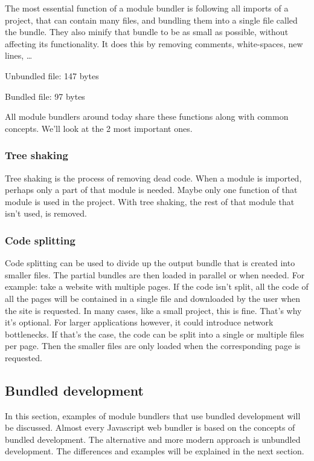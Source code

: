 The most essential function of a module bundler is following all imports of a project, that can contain many files, and bundling them into a single file called the bundle. They also minify that bundle to be as small as possible, without affecting its functionality. It does this by removing comments, white-spaces, new lines, … 

Unbundled file: 147 bytes

Bundled file: 97 bytes


All module bundlers around today share these functions along with common concepts. We’ll look at the 2 most important ones. 

\subsubsection{Tree shaking}

Tree shaking is the process of removing dead code. When a module is imported, perhaps only a part of that module is needed. Maybe only one function of that module is used in the project. With tree shaking, the rest of that module that isn’t used, is removed. 

\subsubsection{Code splitting}

Code splitting can be used to divide up the output bundle that is created into smaller files. The partial bundles are then loaded in parallel or when needed. For example: take a website with multiple pages. If the code isn’t split, all the code of all the pages will be contained in a single file and downloaded by the user when the site is requested. In many cases, like a small project, this is fine. That’s why it’s optional. For larger applications however, it could introduce network bottlenecks. If that’s the case, the code can be split into a single or multiple files per page. Then the smaller files are only loaded when the corresponding page is requested. 

\subsection{Bundled development}

In this section, examples of module bundlers that use bundled development will be discussed. Almost every Javascript web bundler is based on the concepts of bundled development. The alternative and more modern approach is unbundled development. The differences and examples will be explained in the next section. 


